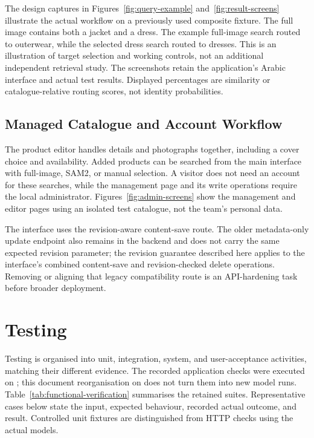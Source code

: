 The design captures in Figures~\ref{fig:query-example} and~\ref{fig:result-screens} illustrate the actual
workflow on a previously used composite fixture. The full image contains both
a jacket and a dress. The example full-image search routed to outerwear, while
the selected dress search routed to dresses. This is an illustration of target
selection and working controls, not an additional independent retrieval study.
The screenshots retain the application's Arabic interface and actual test
results. Displayed percentages are similarity or catalogue-relative routing
scores, not identity probabilities.





\subsection{Managed Catalogue and Account Workflow}
The product editor handles details and photographs together, including a cover
choice and availability. Added products can be searched from the main interface
with full-image, SAM2, or manual selection. A visitor does not need an account
for these searches, while the management page and its write operations require
the local administrator. Figures~\ref{fig:admin-screens} show the management
and editor pages using an isolated test catalogue, not the team's personal data.

The interface uses the revision-aware content-save route. The older metadata-only
update endpoint also remains in the backend and does not carry the same expected
revision parameter; the revision guarantee described here applies to the
interface's combined content-save and revision-checked delete operations.
Removing or aligning that legacy compatibility route is an API-hardening task
before broader deployment.

\section{Testing}
Testing is organised into unit, integration, system, and user-acceptance
activities, matching their different evidence. The recorded application checks
were executed on \ReportVerificationDate; this document reorganisation on
\DocumentRevisionDate{} does not turn them into new model runs. Table~\ref{tab:functional-verification}
summarises the retained suites. Representative cases below state the input,
expected behaviour, recorded actual outcome, and result. Controlled unit
fixtures are distinguished from HTTP checks using the actual models.

